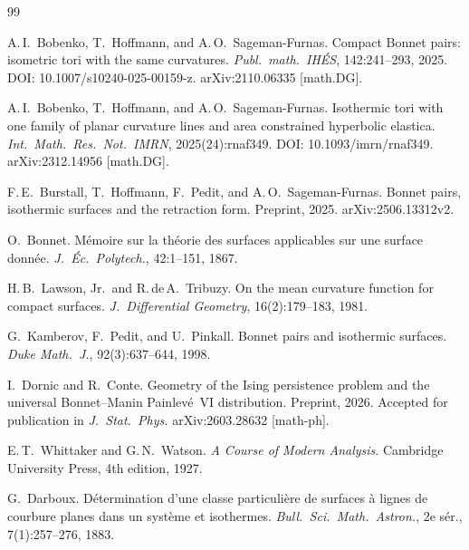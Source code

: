 \documentclass[11pt,a4paper]{article}
\theoremstyle{plain}
\theoremstyle{definition}
\theoremstyle{remark}
\begin{document}

\begin{thebibliography}{99}

A.\,I.~Bobenko, T.~Hoffmann, and A.\,O.~Sageman-Furnas.
\newblock Compact Bonnet pairs: isometric tori with the same curvatures.
\newblock \emph{Publ.\ math.\ IH\'ES}, 142:241--293, 2025.
\newblock DOI: 10.1007/s10240-025-00159-z.
\newblock arXiv:2110.06335 [math.DG].

A.\,I.~Bobenko, T.~Hoffmann, and A.\,O.~Sageman-Furnas.
\newblock Isothermic tori with one family of planar curvature lines and area
  constrained hyperbolic elastica.
\newblock \emph{Int.\ Math.\ Res.\ Not.\ IMRN}, 2025(24):rnaf349.
\newblock DOI: 10.1093/imrn/rnaf349.
\newblock arXiv:2312.14956 [math.DG].

F.\,E.~Burstall, T.~Hoffmann, F.~Pedit, and A.\,O.~Sageman-Furnas.
\newblock Bonnet pairs, isothermic surfaces and the retraction form.
\newblock Preprint, 2025.
\newblock arXiv:2506.13312v2.

O.~Bonnet.
\newblock M\'emoire sur la th\'eorie des surfaces applicables sur une
  surface donn\'ee.
\newblock \emph{J.\ \'Ec.\ Polytech.}, 42:1--151, 1867.

H.\,B.~Lawson, Jr.\ and R.\,de\,A.~Tribuzy.
\newblock On the mean curvature function for compact surfaces.
\newblock \emph{J.\ Differential Geometry}, 16(2):179--183, 1981.

G.~Kamberov, F.~Pedit, and U.~Pinkall.
\newblock Bonnet pairs and isothermic surfaces.
\newblock \emph{Duke Math.\ J.}, 92(3):637--644, 1998.

I.~Dornic and R.~Conte.
\newblock Geometry of the Ising persistence problem and the universal
  Bonnet--Manin Painlev\'e~VI distribution.
\newblock Preprint, 2026. Accepted for publication in
  \emph{J.\ Stat.\ Phys.}
\newblock arXiv:2603.28632 [math-ph].

E.\,T.~Whittaker and G.\,N.~Watson.
\newblock \emph{A Course of Modern Analysis}.
\newblock Cambridge University Press, 4th edition, 1927.

G.~Darboux.
\newblock D\'etermination d'une classe particuli\`ere de surfaces \`a
  lignes de courbure planes dans un syst\`eme et isothermes.
\newblock \emph{Bull.\ Sci.\ Math.\ Astron.}, 2e s\'er., 7(1):257--276,
  1883.


\end{thebibliography}
\end{document}
